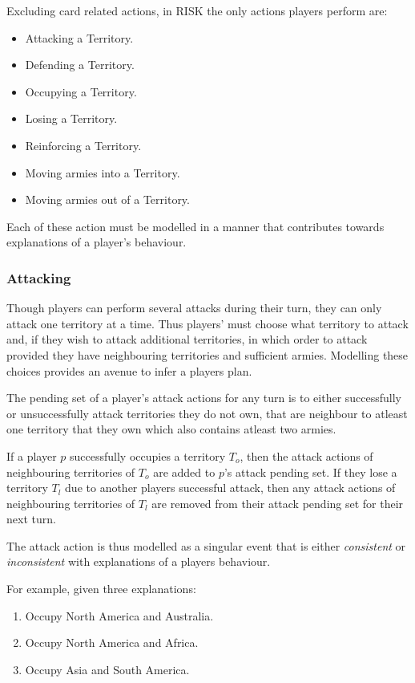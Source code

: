 \documentclass[parskip]{cs4rep}
\begin{document}
Excluding card related actions, in RISK the only actions players perform are:

\begin{itemize}
\item
Attacking a Territory.
\item
Defending a Territory.
\item
Occupying a Territory.
\item
Losing a Territory.
\item
Reinforcing a Territory.
\item
Moving armies into a Territory.
\item
Moving armies out of a Territory.
\end{itemize}

Each of these action must be modelled in a manner that contributes towards explanations of a player's behaviour.

\subsubsection{Attacking}

Though players can perform several attacks during their turn, they can only attack one territory at a time. Thus players' must choose what territory to attack and, if they wish to attack additional territories, in which order to attack provided they have neighbouring territories and sufficient armies. Modelling these choices provides an avenue to infer a players plan.

The pending set of a player's attack actions for any turn is to either successfully or unsuccessfully attack territories they do not own, that are neighbour to atleast one territory that they own which also contains atleast two armies.

If a player $p$ successfully occupies a territory $T_{o}$, then the attack actions of neighbouring territories of $T_{o}$ are added to $p$'s attack pending set. If they lose a territory $T_{l}$ due to another players successful attack, then any attack actions of neighbouring territories of $T_{l}$ are removed from their attack pending set for their next turn. 

The attack action is thus modelled as a singular event that is either \textit{consistent} or \textit{inconsistent} with explanations of a players behaviour.

For example, given three explanations:

\begin{enumerate}
\item
Occupy North America and Australia.
\item
Occupy North America and Africa.
\item
Occupy Asia and South America.
\end{enumerate}
\end{document}
